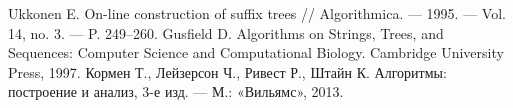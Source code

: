 \begin{thebibliography}{99}
Ukkonen E. On-line construction of suffix trees // Algorithmica. — 1995. — Vol. 14,
no. 3. — P. 249–260.
Gusfield D. Algorithms on Strings, Trees, and Sequences: Computer Science and
Computational Biology. Cambridge University Press, 1997.
Кормен Т., Лейзерсон Ч., Ривест Р., Штайн К. Алгоритмы: построение и анализ, 3-е изд. — М.: «Вильямс», 2013.
\end{thebibliography}
\pagebreak